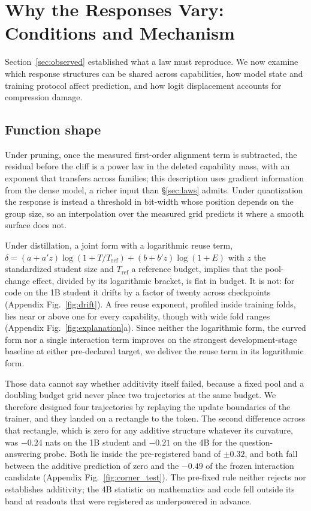 \section{Why the Responses Vary: Conditions and Mechanism}
\label{sec:why}

Section~\ref{sec:observed} established what a law must reproduce. We now examine which response structures can be shared across capabilities, how model state and training protocol affect prediction, and how logit displacement accounts for compression damage.


\subsection{Function shape}
\label{sec:why_shape}

Under pruning, once the measured first-order alignment term is subtracted, the residual before the
cliff is a power law in the deleted capability mass, with an exponent that transfers across
families; this description uses gradient information from the dense
model, a richer input than \S\ref{sec:laws} admits. Under quantization the response is instead a
threshold in bit-width whose position depends on the group size, so an interpolation over the
measured grid predicts it where a smooth surface does not.

Under distillation, a joint form with a logarithmic reuse term,
$\delta=(a+a'z)\log(1+T/T_{\mathrm{ref}})+(b+b'z)\log(1+E)$ with $z$ the standardized student size
and $T_{\mathrm{ref}}$ a reference budget, implies that the pool-change effect, divided by its logarithmic bracket, is flat in budget. It is
not: for code on the 1B student it drifts by a factor of twenty across checkpoints (Appendix
Fig.~\ref{fig:drift}). A free reuse exponent, profiled inside training folds, lies near or above one for every capability,
though with wide fold ranges (Appendix Fig.~\ref{fig:explanation}a). Since neither the logarithmic
form, the curved form nor a single interaction term improves on the strongest development-stage
baseline at either pre-declared target, we deliver the reuse term in its logarithmic form.

Those data cannot say whether additivity itself failed, because a fixed pool and a doubling budget
grid never place two trajectories at the same budget. We therefore designed four trajectories by
replaying the update boundaries of the trainer, and they landed on a rectangle to the token. The second difference across that rectangle, which is zero for any additive structure whatever its
curvature, was $-0.24$ nats on the 1B student and $-0.21$ on the 4B for the question-answering
probe. Both lie inside the pre-registered band of $\pm0.32$, and both fall between the additive
prediction of zero and the $-0.49$ of the frozen interaction candidate
(Appendix Fig.~\ref{fig:corner_test}). The pre-fixed rule neither rejects nor establishes additivity; the 4B statistic on mathematics and code
fell outside its band at readouts that were registered as underpowered in advance.



